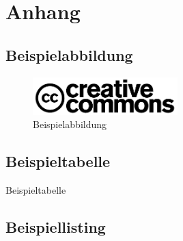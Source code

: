 \section{Anhang}
\label{sec:Anhang}

\subsection{Beispielabbildung}

\begin{figure}[htb]
\centering
\includegraphics[width=0.5\textwidth,keepaspectratio]{Bilder/Beispiel.pdf}
\caption{Beispielabbildung}
\label{fig:Beispiel}
\end{figure} 

\subsection{Beispieltabelle}

\begin{table}[htbp]
\centering
\singlespacing

\caption{Beispieltabelle}
\label{tab:Beispiel}
\end{table}

\subsection{Beispiellisting}


